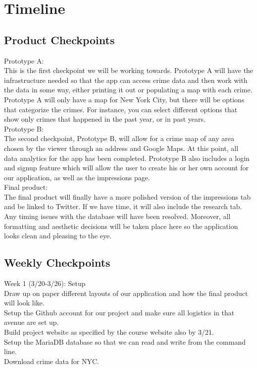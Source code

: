 \documentclass[paper=a4, fontsize=11pt]{scrartcl} %
\numberwithin{equation}{section} %
\numberwithin{figure}{section} %
\numberwithin{table}{section} %
\begin{document}

\section{Timeline}

\subsection{Product Checkpoints}

Prototype A: \\
This is the first checkpoint we will be working towards. Prototype A will have the infrastructure needed so that the app can access crime data and then work with the data in some way, either printing it out or populating a map with each crime. Prototype A will only have a map for New York City, but there will be options that categorize the crimes. For instance, you can select different options that show only crimes that happened in the past year, or in past years. \\

Prototype B: \\
The second checkpoint, Prototype B, will allow for a crime map of any area chosen by the viewer through an address and Google Maps. At this point, all data analytics for the app has been completed. Prototype B also includes a login and signup feature which will allow the user to create his or her own account for our application, as well as the impressions page. \\

Final product: \\
The final product will finally have a more polished version of the impressions tab and be linked to Twitter. If we have time, it will also include the research tab. Any timing issues with the database will have been resolved. Moreover, all formatting and aesthetic decisions will be taken place here so the application looks clean and pleasing to the eye. \\

\subsection{Weekly Checkpoints}

Week 1 (3/20-3/26): Setup \\
Draw up on paper different layouts of our application and how the final product will look like. \\
Setup the Github account for our project and make sure all logistics in that avenue are set up. \\
Build project website as specified by the course website also by 3/21. \\
Setup the MariaDB database so that we can read and write from the command line. \\
Download crime data for NYC. \\
\end{document}
